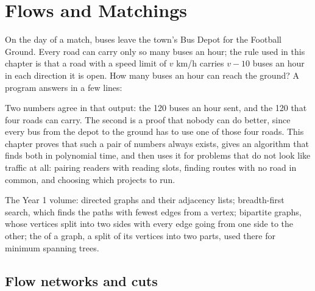 \chapter{Flows and Matchings}\label{ch:b2:flows-and-matchings}

On the day of a match, buses leave the town's Bus Depot for the Football Ground. Every road can carry only so many buses
an hour; the rule used in this chapter is that a road with a speed limit of $v$ km/h carries $v - 10$ buses an hour in
each direction it is open. How many buses an hour can reach the ground? A program answers in a few lines:

\label{lst:b2:flows-and-matchings:town}

\label{out:b2:flows-and-matchings:town}

Two numbers agree in that output: the 120 buses an hour sent, and the 120 that four roads can carry. The second is a
proof that nobody can do better, since every bus from the depot to the ground has to use one of those four roads. This
chapter proves that such a pair of numbers always exists, gives an algorithm that finds both in polynomial time, and
then uses it for problems that do not look like traffic at all: pairing readers with reading slots, finding routes with
no road in common, and choosing which projects to run.

\begin{recall}
The Year 1 volume: directed graphs and their adjacency lists; breadth-first search, which finds the paths with fewest
edges from a vertex; bipartite graphs, whose vertices split into two sides with every edge going from one side to the
other; the  of a graph, a split of its vertices into two parts, used there for minimum spanning trees.
\end{recall}

\section{Flow networks and cuts}\label{sec:b2:flows-and-matchings:networks}

